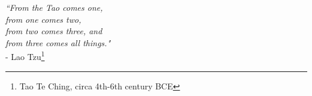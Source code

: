 

\begin{adjustwidth}{3cm}{0cm}
\begin{flushright}
\emph{``From the Tao comes one,\\
from one comes two,\\
from two comes three, and\\
from three comes all things."}\\
 - Lao Tzu\footnote{Tao Te Ching, circa 4th-6th century BCE}
\end{flushright}
\end{adjustwidth}
    
